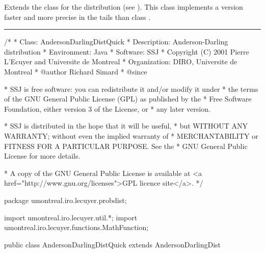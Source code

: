


Extends the class  for the
\ad{}  distribution (see \cite{tAND52a,tLEW61a,tSTE86b}).
This class implements a version faster and more precise in the tails
than class .


\bigskip\hrule

\begin{code}
\begin{hide}
/*
 * Class:        AndersonDarlingDistQuick
 * Description:  Anderson-Darling distribution
 * Environment:  Java
 * Software:     SSJ
 * Copyright (C) 2001  Pierre L'Ecuyer and Universite de Montreal
 * Organization: DIRO, Universite de Montreal
 * @author       Richard Simard
 * @since

 * SSJ is free software: you can redistribute it and/or modify it under
 * the terms of the GNU General Public License (GPL) as published by the
 * Free Software Foundation, either version 3 of the License, or
 * any later version.

 * SSJ is distributed in the hope that it will be useful,
 * but WITHOUT ANY WARRANTY; without even the implied warranty of
 * MERCHANTABILITY or FITNESS FOR A PARTICULAR PURPOSE.  See the
 * GNU General Public License for more details.

 * A copy of the GNU General Public License is available at
   <a href="http://www.gnu.org/licenses">GPL licence site</a>.
 */
\end{hide}
package umontreal.iro.lecuyer.probdist;
\begin{hide}
import umontreal.iro.lecuyer.util.*;
import umontreal.iro.lecuyer.functions.MathFunction;
\end{hide}

public class AndersonDarlingDistQuick extends AndersonDarlingDist\begin{hide} {

   private static class Function implements MathFunction {
      protected int n;
      protected double u;

      public Function (int n, double u) {
         this.n = n;
         this.u = u;
      }

      public double evaluate (double x) {
         return u - cdf(n,x);
      }
   }

   //-------------------------------------------------------------------------

   private static double lower_Marsaglia (int n, double x) {
      // queue inférieure de l'algorithme de Marsaglia pour n = inf

      double p0 = (2.00012 + (.247105 - (.0649821 - (.0347962 -
                  (.011672 - .00168691 * x) * x) * x) * x) * x);
      p0 *= Math.exp (-1.2337141 / x) / Math.sqrt (x);
      return p0 >= 0 ? p0 : 0;
   }


   private static double diffcdf (int n, double x, double EPS) {
      return (cdf(n, x + EPS) - cdf(n, x - EPS)) / (2.0 * EPS);
   }

\end{hide}
\end{code}
